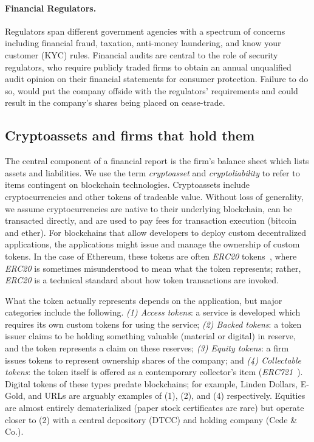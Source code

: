 \paragraph{Financial Regulators.} Regulators span different government agencies with a spectrum of concerns including financial fraud, taxation, anti-money laundering, and know your customer (KYC) rules. Financial audits are central to the role of security regulators, who require publicly traded firms to obtain an annual unqualified audit opinion on their financial statements for consumer protection. Failure to do so, would put the company offside with the regulators{'} requirements and could result in the company{'}s shares being placed on cease-trade. 


\subsection{Cryptoassets and firms that hold them}
The central component of a financial report is the firm's balance sheet which lists assets and liabilities. We use the term \textit{cryptoasset} and \textit{cryptoliability} to refer to items contingent on blockchain technologies. Cryptoassets include cryptocurrencies and other tokens of tradeable value. Without loss of generality, we assume cryptocurrencies are native to their underlying blockchain, can be transacted directly, and are used to pay fees for transaction execution (\eg bitcoin and ether). For blockchains that allow developers to deploy custom decentralized applications, the applications might issue and manage the ownership of custom tokens. In the case of Ethereum, these tokens are often \textit{ERC20} tokens~\cite{erc20}, where \textit{ERC20} is sometimes misunderstood to mean what the token represents; rather, \textit{ERC20} is a technical standard about how token transactions are invoked.

What the token actually represents depends on the application, but major categories include the following. \textit{(1) Access tokens}: a service is developed which requires its own custom tokens for using the service; \textit{(2) Backed tokens}: a token issuer claims to be holding something valuable (material or digital) in reserve, and the token represents a claim on these reserves; \textit{(3) Equity tokens}: a firm issues tokens to represent ownership shares of the company; and \textit{(4) Collectable tokens}: the token itself is offered as a contemporary collector's item (\eg \textit{ERC721}~\cite{erc721}). Digital tokens of these types predate blockchains; for example, \textsf{Linden Dollars}, \textsf{E-Gold}, and URLs are arguably examples of (1), (2), and (4) respectively. Equities are almost entirely dematerialized (\eg paper stock certificates are rare) but operate closer to (2) with a central depository (\eg DTCC) and holding company (\eg Cede \& Co.).

